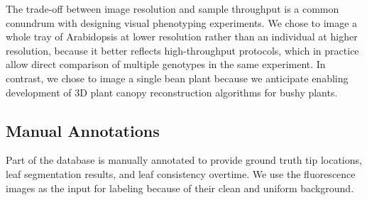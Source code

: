 
The trade-off between image resolution and sample throughput is a common conundrum with designing visual phenotyping experiments.
We chose to image a whole tray of Arabidopsis at lower resolution rather than an individual at higher resolution, because it better reflects high-throughput protocols, which in practice allow direct comparison of multiple genotypes in the same experiment.
In contrast, we chose to image a single bean plant because we anticipate enabling development of $3$D plant canopy reconstruction algorithms for bushy plants.


\subsection{Manual Annotations}
\label{sec:annotation}
Part of the database is manually annotated to provide ground truth tip locations, leaf segmentation results, and leaf consistency overtime.
We use the fluorescence images as the input for labeling because of their clean and uniform background.

